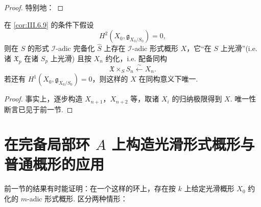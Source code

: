 \begin{proof}
特别地：
\end{proof}

\begin{corollary}\label{cor:III.6.10}
在 \ref{cor:III.6.9} 的条件下假设
\[
H^2(X_0, \mathfrak{g}_{X_0/S_0}) = 0,
\]
则在 $S$ 的形式 $\mathcal{I}$-adic 完备化 $\widehat{S}$ 上存在 $\mathcal{I}$-adic 形式概形 $X$，它``在 $S$ 上光滑''(i.e. 诸 $\mathfrak{X}_p$ 在诸 $S_p$ 上光滑) 且按 $X_n$ 约化，i.e. 配备同构
\[
\mathfrak{X} \times_S S_n \stackrel{\sim}{\longleftarrow} X_n.
\]
若还有 $H^1(X_0, \mathfrak{g}_{X_0/S_0}) = 0$，则这样的 $X$ 在同构意义下唯一.
\end{corollary}

\begin{proof}
事实上，逐步构造 $X_{n+1}$，$X_{n+2}$ 等，取诸 $X_i$ 的归纳极限得到 $X$. 唯一性断言已见于前一节.
\end{proof}

\section{在完备局部环 \texorpdfstring{$A$}{A} 上构造光滑形式概形与普通概形的应用}

前一节的结果有时能证明：在一个这样的环上，存在按 $k$ 上给定光滑概形 $X_0$ 约化的 $m$-adic 形式概形. 区分两种情形：

